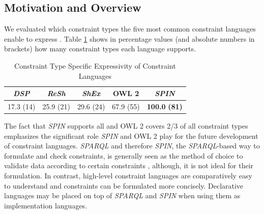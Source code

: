 \documentclass[a4paper,fontsize=11pt]{scrartcl}
\begin{document}
\subsection{Motivation and Overview}

We evaluated which constraint types the five most common constraint languages enable to express \cite{BoschNolleAcarEckert2015}.
Table \ref{tab:constraint-type-specific-expressivity} shows in percentage values (and absolute numbers in brackets) how many constraint types each language supports.

\begin{table}[H]
	\centering
		\caption{Constraint Type Specific Expressivity of Constraint Languages}
	  \scriptsize
		\begin{tabular}{c|c|c|c|c}
			\emph{DSP} & \emph{ReSh} & \emph{ShEx} & OWL 2 & \emph{SPIN} \\	
      \hline
			17.3 (14) & 25.9 (21) & 29.6 (24) & 67.9 (55) & \textbf{100.0} \textbf{(81)} 
		\end{tabular}
	\label{tab:constraint-type-specific-expressivity}
\end{table}

The fact that \emph{SPIN} supports all and OWL 2 covers 2/3 of all constraint types
emphasizes the significant role \emph{SPIN} and OWL 2 play for the future development of constraint languages.
\emph{SPARQL} and therefore \emph{SPIN}, the \emph{SPARQL}-based way to formulate and check constraints, is generally seen as the method of choice to validate data according to certain constraints \cite{Fuerber2010}, 
although, it is not ideal for their formulation. 
In contrast, high-level constraint languages are comparatively easy to understand and constraints can be formulated more concisely.
Declarative languages may be placed on top of \emph{SPARQL} and \emph{SPIN} when using them as implementation languages.
\end{document}

